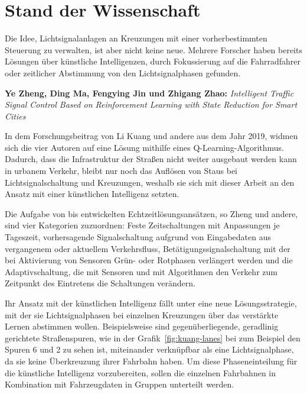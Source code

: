 %
%


\section{Stand der Wissenschaft}\label{sec:state-of-science}

Die Idee, Lichtsignalanlagen an Kreuzungen mit einer vorherbestimmten Steuerung zu verwalten, ist aber nicht keine neue.
Mehrere Forscher haben bereits Lösungen über künstliche Intelligenzen, durch Fokussierung auf die Fahrradfahrer oder zeitlicher Abstimmung von den Lichtsignalphasen gefunden.

\textbf{Ye Zheng, Ding Ma, Fengying Jin und Zhigang Zhao:}
\textit{Intelligent Traffic Signal Control Based on Reinforcement Learning with State Reduction for Smart Cities}

In dem Forschungsbeitrag von Li Kuang und andere aus dem Jahr 2019, widmen sich die vier Autoren auf eine Lösung mithilfe eines Q-Learning-Algorithmus.
Dadurch, dass die Infrastruktur der Straßen nicht weiter ausgebaut werden kann in urbanem Verkehr, bleibt nur noch das Auflösen von Staus bei Lichtsignalschaltung und Kreuzungen\cite{Zheng2019}, weshalb sie sich mit dieser Arbeit an den Ansatz mit einer künstlichen Intelligenz setzten.

Die Aufgabe von bis entwickelten Echtzeitlösungsansätzen, so Zheng und andere, sind vier Kategorien zuzuordnen:
Feste Zeitschaltungen mit Anpassungen je Tageszeit, vorhersagende Signalschaltung aufgrund von Eingabedaten aus vergangenem oder aktuellem Verkehrsfluss, Betätigungssignalschaltung mit der bei Aktivierung von Sensoren Grün- oder Rotphasen verlängert werden und die Adaptivschaltung, die mit Sensoren und mit Algorithmen den Verkehr zum Zeitpunkt des Eintretens die Schaltungen verändern\cite{Zheng2019}.

Ihr Ansatz mit der künstlichen Intelligenz fällt unter eine neue Lösungsstrategie, mit der sie Lichtsignalphasen bei einzelnen Kreuzungen über das verstärkte Lernen abstimmen wollen\cite{Zheng2019}.
Beispielsweise sind gegenüberliegende, geradlinig gerichtete Straßenspuren, wie in der Grafik~\ref{fig:kuang-lanes} bei zum Beispiel den Spuren 6 und 2 zu sehen ist, miteinander verknüpfbar als eine Lichtsignalphase, da sie keine Überkreuzung ihrer Fahrbahn haben.
Um diese Phaseneinteilung für die künstliche Intelligenz vorzubereiten, sollen die einzelnen Fahrbahnen in Kombination mit Fahrzeugdaten in Gruppen unterteilt werden\cite{Zheng2019}.

